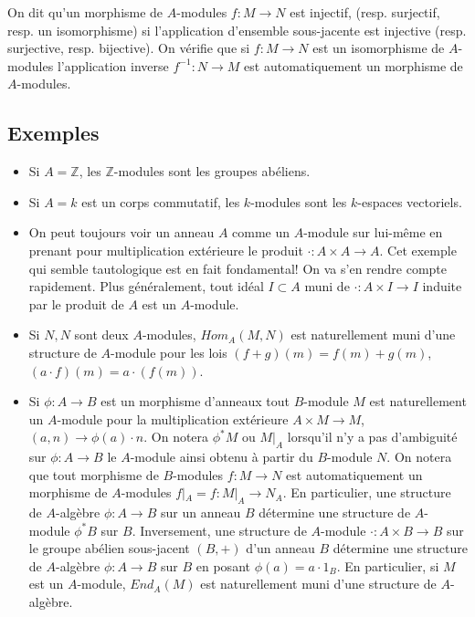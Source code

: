 \documentclass[a4paper, oneside, 12pt]{book}
\theoremstyle{definition} %
\newcommand{\Z}{\mathbb{Z}}
\begin{document}
  

 On dit qu'un morphisme de $A$-modules $f:M\rightarrow N$ est injectif, (resp. surjectif, resp. un isomorphisme) si l'application d'ensemble sous-jacente est injective (resp. surjective, resp. bijective). On vérifie que si   $f:M\rightarrow N$ est un isomorphisme de $A$-modules l'application inverse $f^{-1}:N\rightarrow M$ est automatiquement un morphisme de $A$-modules.

 \subsection{Exemples}
\begin{itemize}[leftmargin=* ,parsep=0cm,itemsep=0cm,topsep=0cm]
\item  Si $A=\Z$, les $\Z$-modules sont les groupes abéliens.\\
\item  Si $A=k$ est un corps commutatif, les $k$-modules sont les $k$-espaces vectoriels.\\
\item On peut toujours voir un anneau $A$ comme un $A$-module sur lui-même en prenant pour multiplication extérieure le produit $\cdot:A\times A\rightarrow A$. Cet exemple qui semble tautologique est en fait fondamental! On va s'en rendre compte rapidement. Plus généralement, tout idéal $I\subset A$ muni de $\cdot:A\times I\rightarrow I$ induite par le produit de $A$ est un $A$-module.
\item Si $N,N$ sont deux $A$-modules, $Hom_A(M,N)$ est naturellement muni d'une structure de $A$-module pour les lois $(f+g)(m)=f(m)+g(m)$, $(a\cdot f)(m)=a\cdot (f(m))$.  
\item Si $\phi:A\rightarrow B$ est un morphisme d'anneaux tout $B$-module $M$ est naturellement un $A$-module pour la multiplication extérieure $ A\times M\rightarrow M$, $(a,n)\rightarrow \phi(a)\cdot n$. On notera $\phi^*M$ ou $M|_A$ lorsqu'il n'y a pas d'ambiguité sur $\phi:A\rightarrow B$ le $A$-module ainsi obtenu à partir du $B$-module $N$. On notera que tout morphisme de $B$-modules $f:M\rightarrow N$ est automatiquement un morphisme de $A$-modules $f|_A=f:M|_A\rightarrow N_A$. En particulier,  une structure de $A$-algèbre $\phi:A\rightarrow B$ sur un anneau $B$ détermine une structure de $A$-module $\phi^*B$ sur $B$. Inversement, une structure de $A$-module $\cdot:A\times B\rightarrow B$ sur le   groupe abélien sous-jacent $(B,+)$ d'un anneau  $B$ détermine une structure de $A$-algèbre $\phi:A\rightarrow B$ sur $B$ en posant $\phi(a)=a\cdot 1_B$. En particulier, si $M$ est un $A$-module, $End_A(M)$ est naturellement muni d'une structure de $A$-algèbre.  

\end{itemize}
\end{document}
